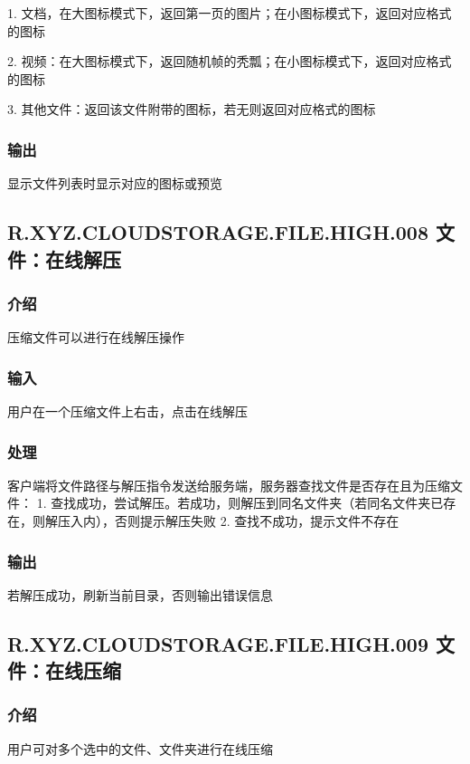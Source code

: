 1. 文档，在大图标模式下，返回第一页的图片；在小图标模式下，返回对应格式的图标

2. 视频：在大图标模式下，返回随机帧的秃瓢；在小图标模式下，返回对应格式的图标

3. 其他文件：返回该文件附带的图标，若无则返回对应格式的图标

\subsubsection{输出} 
显示文件列表时显示对应的图标或预览


\subsection{R.XYZ.CLOUDSTORAGE.FILE.HIGH.008 文件：在线解压}

\subsubsection{介绍}
压缩文件可以进行在线解压操作

\subsubsection{输入} 
用户在一个压缩文件上右击，点击在线解压

\subsubsection{处理} 
客户端将文件路径与解压指令发送给服务端，服务器查找文件是否存在且为压缩文件：
1. 查找成功，尝试解压。若成功，则解压到同名文件夹（若同名文件夹已存在，则解压入内），否则提示解压失败
2. 查找不成功，提示文件不存在


\subsubsection{输出} 
若解压成功，刷新当前目录，否则输出错误信息

\subsection{R.XYZ.CLOUDSTORAGE.FILE.HIGH.009 文件：在线压缩}

\subsubsection{介绍}
用户可对多个选中的文件、文件夹进行在线压缩
 
